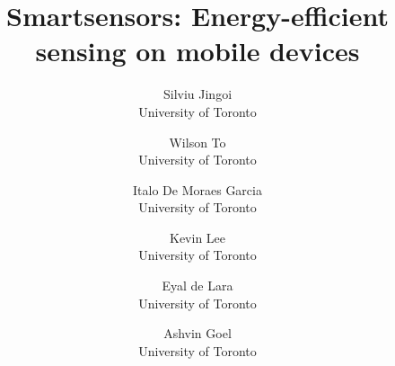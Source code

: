 \documentclass[letterpaper,twocolumn,10pt]{article}
\begin{document}
\date{}


\title{\Large \bf Smartsensors: Energy-efficient sensing on mobile devices}


\author{
{\rm Silviu Jingoi}\\
University of Toronto
\and
{\rm Wilson To}\\
University of Toronto
\and
{\rm Italo De Moraes Garcia}\\
University of Toronto
\and
{\rm Kevin Lee}\\
University of Toronto
\and
{\rm Eyal de Lara}\\
University of Toronto
\and
{\rm Ashvin Goel}\\
University of Toronto
} %

\maketitle















{\footnotesize 
}
\end{document}
